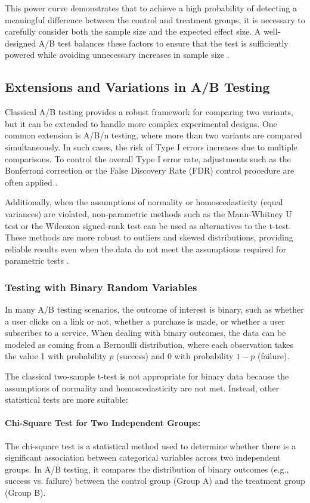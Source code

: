 \documentclass[magisterska, english]{pwr_wmat_praca_dyplomowa}
\theoremstyle{plain}
\numberwithin{theorem}{chapter}
\theoremstyle{definition}
\numberwithin{theorem}{chapter}
\begin{document}
This power curve demonstrates that to achieve a high probability of detecting a meaningful difference between the control and treatment groups, it is necessary to carefully consider both the sample size and the expected effect size. A well-designed A/B test balances these factors to ensure that the test is sufficiently powered while avoiding unnecessary increases in sample size \cite{Button2013}.
\subsection{Extensions and Variations in A/B Testing}

Classical A/B testing provides a robust framework for comparing two variants, but it can be extended to handle more complex experimental designs. One common extension is A/B/n testing, where more than two variants are compared simultaneously. In such cases, the risk of Type I errors increases due to multiple comparisons. To control the overall Type I error rate, adjustments such as the Bonferroni correction or the False Discovery Rate (FDR) control procedure are often applied \cite{Benjamini1995, Holm1979}.

Additionally, when the assumptions of normality or homoscedasticity (equal variances) are violated, non-parametric methods such as the Mann-Whitney U test or the Wilcoxon signed-rank test can be used as alternatives to the t-test. These methods are more robust to outliers and skewed distributions, providing reliable results even when the data do not meet the assumptions required for parametric tests \cite{Hollander2013}.

\subsubsection{Testing with Binary Random Variables}

In many A/B testing scenarios, the outcome of interest is binary, such as whether a user clicks on a link or not, whether a purchase is made, or whether a user subscribes to a service. When dealing with binary outcomes, the data can be modeled as coming from a Bernoulli distribution, where each observation takes the value 1 with probability $p$ (success) and 0 with probability $1-p$ (failure).

The classical two-sample t-test is not appropriate for binary data because the assumptions of normality and homoscedasticity are not met. Instead, other statistical tests are more suitable:

\paragraph{Chi-Square Test for Two Independent Groups:} The chi-square test is a statistical method used to determine whether there is a significant association between categorical variables across two independent groups. In A/B testing, it compares the distribution of binary outcomes (e.g., success vs. failure) between the control group (Group A) and the treatment group (Group B).
\end{document}
